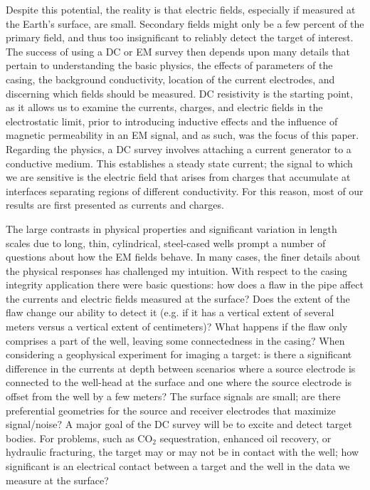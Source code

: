 Despite this potential, the reality is that electric fields, especially if measured at the Earth's surface, are small. Secondary fields might only be a few percent of the primary field, and thus too insignificant to reliably detect the target of interest. The success of using a DC or EM survey then depends upon many details that pertain to understanding the basic physics, the effects of parameters of the casing, the background conductivity, location of the current electrodes, and discerning which fields should be measured. DC resistivity is the starting point, as it allows us to examine the currents, charges, and electric fields in the electrostatic limit, prior to introducing inductive effects and the influence of magnetic permeability in an EM signal, and as such, was the focus of this paper. Regarding the physics, a DC survey involves attaching a current generator to a conductive medium. This establishes a steady state current; the signal to which we are sensitive is the electric field that arises from charges that accumulate at interfaces separating regions of different conductivity. For this reason, most of our results are first presented as currents and charges.

The large contrasts in physical properties and significant variation in length scales due to long, thin, cylindrical, steel-cased wells prompt a number of questions about how the EM fields behave. In many cases, the finer details about the physical responses has challenged my intuition. With respect to the casing integrity application there were basic questions: how does a flaw in the pipe affect the currents and electric fields measured at the surface? Does the extent of the flaw change our ability to detect it (e.g. if it has a vertical extent of several meters versus a vertical extent of centimeters)? What happens if the flaw only comprises a part of the well, leaving some connectedness in the casing? When considering a geophysical experiment for imaging a target: is there a significant difference in the currents at depth between scenarios where a source electrode is connected to the well-head at the surface and one where the source electrode is offset from the well by a few meters? The surface signals are small; are there preferential geometries for the source and receiver electrodes that maximize signal/noise? A major goal of the DC survey will be to excite and detect target bodies. For problems, such as CO$_2$ sequestration, enhanced oil recovery, or hydraulic fracturing, the target may or may not be in contact with the well; how significant is an electrical contact between a target and the well in the data we measure at the surface?

